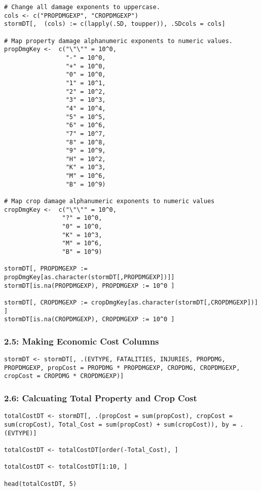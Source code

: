 \documentclass[
]{article}
\begin{document}
\begin{verbatim}
# Change all damage exponents to uppercase.
cols <- c("PROPDMGEXP", "CROPDMGEXP")
stormDT[,  (cols) := c(lapply(.SD, toupper)), .SDcols = cols]

# Map property damage alphanumeric exponents to numeric values.
propDmgKey <-  c("\"\"" = 10^0,
                 "-" = 10^0, 
                 "+" = 10^0,
                 "0" = 10^0,
                 "1" = 10^1,
                 "2" = 10^2,
                 "3" = 10^3,
                 "4" = 10^4,
                 "5" = 10^5,
                 "6" = 10^6,
                 "7" = 10^7,
                 "8" = 10^8,
                 "9" = 10^9,
                 "H" = 10^2,
                 "K" = 10^3,
                 "M" = 10^6,
                 "B" = 10^9)

# Map crop damage alphanumeric exponents to numeric values
cropDmgKey <-  c("\"\"" = 10^0,
                "?" = 10^0, 
                "0" = 10^0,
                "K" = 10^3,
                "M" = 10^6,
                "B" = 10^9)

stormDT[, PROPDMGEXP := propDmgKey[as.character(stormDT[,PROPDMGEXP])]]
stormDT[is.na(PROPDMGEXP), PROPDMGEXP := 10^0 ]

stormDT[, CROPDMGEXP := cropDmgKey[as.character(stormDT[,CROPDMGEXP])] ]
stormDT[is.na(CROPDMGEXP), CROPDMGEXP := 10^0 ]
\end{verbatim}

\hypertarget{making-economic-cost-columns}{%
\subsubsection{2.5: Making Economic Cost
Columns}\label{making-economic-cost-columns}}

\begin{verbatim}
stormDT <- stormDT[, .(EVTYPE, FATALITIES, INJURIES, PROPDMG, PROPDMGEXP, propCost = PROPDMG * PROPDMGEXP, CROPDMG, CROPDMGEXP, cropCost = CROPDMG * CROPDMGEXP)]
\end{verbatim}

\hypertarget{calcuating-total-property-and-crop-cost}{%
\subsubsection{2.6: Calcuating Total Property and Crop
Cost}\label{calcuating-total-property-and-crop-cost}}

\begin{verbatim}
totalCostDT <- stormDT[, .(propCost = sum(propCost), cropCost = sum(cropCost), Total_Cost = sum(propCost) + sum(cropCost)), by = .(EVTYPE)]

totalCostDT <- totalCostDT[order(-Total_Cost), ]

totalCostDT <- totalCostDT[1:10, ]

head(totalCostDT, 5)
\end{verbatim}
\end{document}
